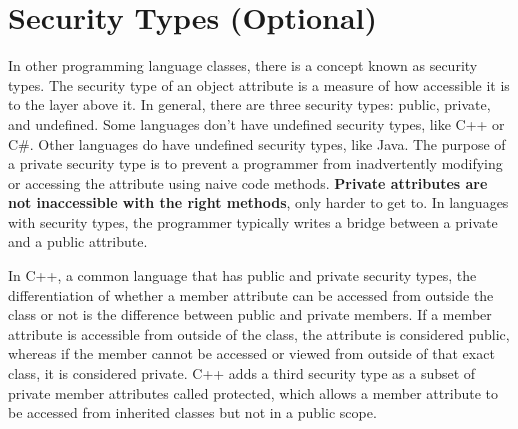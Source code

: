 \section{Security Types (Optional)}
In other programming language classes, there is a concept known as security types. The security type of an object attribute is a measure of how accessible it is to the layer above it. In general, there are three security types: public, private, and undefined. Some languages don't have undefined security types, like C++ or C\#. Other languages do have undefined security types, like Java. The purpose of a private security type is to prevent a programmer from inadvertently modifying or accessing the attribute using naive code methods. \textbf{Private attributes are not inaccessible with the right methods}, only harder to get to. In languages with security types, the programmer typically writes a bridge between a private and a public attribute.\par
In C++, a common language that has public and private security types, the differentiation of whether a member attribute can be accessed from outside the class or not is the difference between public and private members. If a member attribute is accessible from outside of the class, the attribute is considered public, whereas if the member cannot be accessed or viewed from outside of that exact class, it is considered private. C++ adds a third security type as a subset of private member attributes called protected, which allows a member attribute to be accessed from inherited classes but not in a public scope.\par
